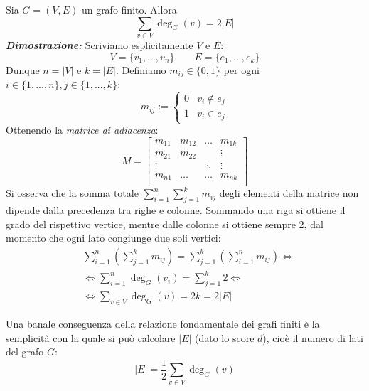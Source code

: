 \documentclass[oneside]{book}
\begin{document}
\begin{tcolorbox}[title={Relazione fondamentale dei grafi finiti}]
Sia $G=(V,E)$ un grafo finito. Allora
\[ \sum_{v\in V} \deg_G(v) = 2|E| \]
\textit{\textbf{Dimostrazione:}} Scriviamo esplicitamente $V$ e $E$:
\[ V=\{v_1,...,v_n\} \qquad E=\{e_1,...,e_k\} \]
Dunque $n=|V|$ e $k=|E|$. Definiamo $m_{ij} \in \{0,1\}$ per ogni
$i \in \{1,...,n\}, j \in \{1,...,k\}$:
\[
    m_{ij} :=
    \begin{cases}
        0 & v_i \not \in e_j\\
        1 & v_i \in e_j
    \end{cases}
\]
Ottenendo la \textit{matrice di adiacenza}:
\[ 
    M =
    \begin{bmatrix}
        m_{11} & m_{12} & \dots  & m_{1k}\\
        m_{21} & m_{22} &        & \vdots\\
        \vdots &        & \ddots & \vdots\\
        m_{n1} & \dots  & \dots  & m_{nk}\\
    \end{bmatrix}
\]
Si osserva che la somma totale $\sum_{i=1}^{n}\sum_{j=1}^{k}m_{ij}$ degli elementi
della matrice non dipende dalla precedenza tra righe e colonne. Sommando
una riga si ottiene il grado del rispettivo vertice, mentre dalle
colonne si ottiene sempre 2, dal momento che ogni lato congiunge due
soli vertici:
\begin{align*}
    &\sum_{i=1}^{n}\left(\sum_{j=1}^{k}m_{ij}\right) = \sum_{j=1}^{k}\left(\sum_{i=1}^{n}m_{ij}\right)\Leftrightarrow\\
    &\Leftrightarrow \sum_{i=1}^{n}\deg_G(v_i) = \sum_{j=1}^{k}2\Leftrightarrow\\
    &\Leftrightarrow \sum_{v\in V}\deg_G(v)=2k=2|E|
\end{align*}
\cvd
\end{tcolorbox}

\begin{osservaz}
Una banale conseguenza della relazione fondamentale dei grafi finiti è
la semplicità con la quale si può calcolare $|E|$ (dato lo score $d$), cioè
il numero di lati del grafo $G$:
\[ |E| = \frac{1}{2}\sum_{v\in V}\deg_G(v) \]
\end{osservaz}
\end{document}
